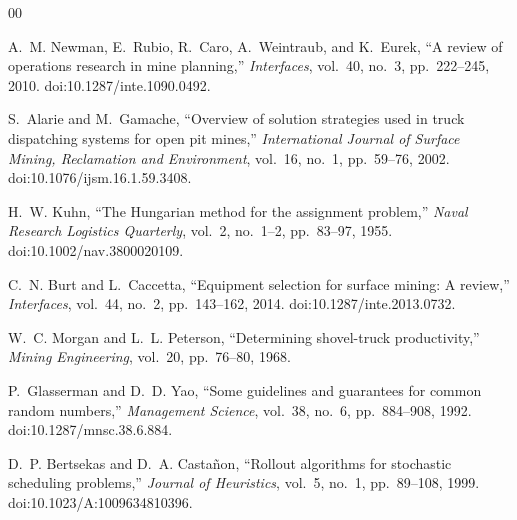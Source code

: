 \documentclass[journal]{IEEEtran}
\begin{document}
\begin{thebibliography}{00}

 A.~M. Newman, E.~Rubio, R.~Caro, A.~Weintraub, and K.~Eurek, ``A review of operations research
in mine planning,'' \emph{Interfaces}, vol.~40, no.~3, pp.~222--245, 2010. doi:10.1287/inte.1090.0492.

 S.~Alarie and M.~Gamache, ``Overview of solution strategies used in truck dispatching systems
for open pit mines,'' \emph{International Journal of Surface Mining, Reclamation and Environment}, vol.~16,
no.~1, pp.~59--76, 2002. doi:10.1076/ijsm.16.1.59.3408.

 H.~W. Kuhn, ``The Hungarian method for the assignment problem,'' \emph{Naval Research Logistics
Quarterly}, vol.~2, no.~1--2, pp.~83--97, 1955. doi:10.1002/nav.3800020109.

 C.~N. Burt and L.~Caccetta, ``Equipment selection for surface mining: A review,''
\emph{Interfaces}, vol.~44, no.~2, pp.~143--162, 2014. doi:10.1287/inte.2013.0732.

 W.~C. Morgan and L.~L. Peterson, ``Determining shovel-truck productivity,'' \emph{Mining
Engineering}, vol.~20, pp.~76--80, 1968.

 P.~Glasserman and D.~D. Yao, ``Some guidelines and guarantees for common random numbers,''
\emph{Management Science}, vol.~38, no.~6, pp.~884--908, 1992. doi:10.1287/mnsc.38.6.884.

 D.~P. Bertsekas and D.~A. Casta\~non, ``Rollout algorithms for stochastic scheduling
problems,'' \emph{Journal of Heuristics}, vol.~5, no.~1, pp.~89--108, 1999. doi:10.1023/A:1009634810396.

\end{thebibliography}
\end{document}
